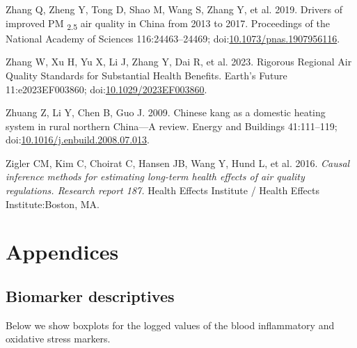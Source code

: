 \documentclass[
  letterpaper,
  DIV=11,
  numbers=noendperiod]{scrartcl}
\newlength{\cslhangindent}
\newenvironment{CSLReferences}[2] %
 {\begin{list}{}{%
  \setlength{\itemindent}{0pt}
  \setlength{\leftmargin}{0pt}
  \setlength{\parsep}{0pt}
  \ifodd #1
   \setlength{\leftmargin}{\cslhangindent}
   \setlength{\itemindent}{-1\cslhangindent}
  \fi
  \setlength{\itemsep}{#2\baselineskip}}}
 {\end{list}}
\begin{document}
\begin{CSLReferences}{1}{1}
Zhang Q, Zheng Y, Tong D, Shao M, Wang S, Zhang Y, et al. 2019. Drivers
of improved {PM} {\textsubscript{2.5}} air quality in {China} from 2013
to 2017. Proceedings of the National Academy of Sciences
116:24463--24469;
doi:\href{https://doi.org/10.1073/pnas.1907956116}{10.1073/pnas.1907956116}.

Zhang W, Xu H, Yu X, Li J, Zhang Y, Dai R, et al. 2023. Rigorous
{Regional Air Quality Standards} for {Substantial Health Benefits}.
Earth's Future 11:e2023EF003860;
doi:\href{https://doi.org/10.1029/2023EF003860}{10.1029/2023EF003860}.

Zhuang Z, Li Y, Chen B, Guo J. 2009. Chinese kang as a domestic heating
system in rural northern {China}---{A} review. Energy and Buildings
41:111--119;
doi:\href{https://doi.org/10.1016/j.enbuild.2008.07.013}{10.1016/j.enbuild.2008.07.013}.

Zigler CM, Kim C, Choirat C, Hansen JB, Wang Y, Hund L, et al. 2016.
\emph{Causal inference methods for estimating long-term health effects
of air quality regulations. {Research} report 187.} Health Effects
Institute / Health Effects Institute:Boston, MA.

\end{CSLReferences}

\newpage
\appendix
\renewcommand{\thefigure}{A\arabic{figure}}
\renewcommand{\thetable}{A\arabic{table}}
\setcounter{figure}{0}
\setcounter{table}{0}

\section{Appendices}\label{appendices}

\subsection{Biomarker descriptives}\label{biomarker-descriptives}

Below we show boxplots for the logged values of the blood inflammatory
and oxidative stress markers.
\end{document}
